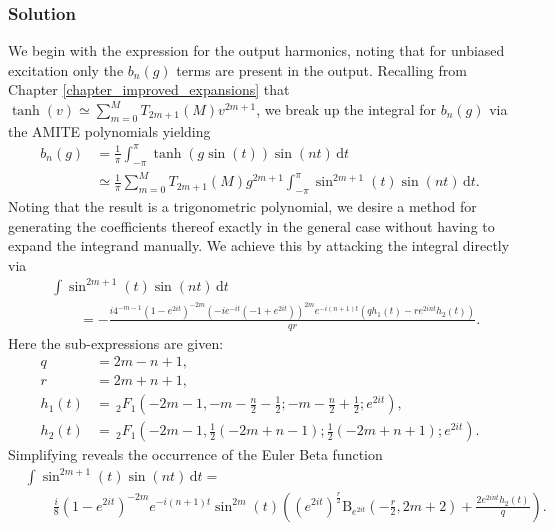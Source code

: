 \subsubsection{Solution}
We begin with the expression for the output harmonics, noting that for unbiased
excitation only the $b_n(g)$ terms are present in the output.
Recalling from Chapter \ref{chapter_improved_expansions} that
$\tanh(v) \simeq \sum_{m=0}^{M} T_{2m+1}(M) v^{2m+1}$,
we break up the integral for $b_n(g)$ via the AMITE polynomials yielding
\begin{align}
	b_n(g) &= \frac{1}{\pi}\int_{-\pi}^{\pi} \! \tanh(g \sin(t)) \sin(nt) \, \mathrm{d}t \\
	       &\simeq \frac{1}{\pi} \sum_{m=0}^{M} T_{2m+1}(M) g^{2m+1}
	                            \int_{-\pi}^{\pi} \sin^{2m+1}(t) \sin(nt) \, \mathrm{d}t.
	                            \label{eq_nl_gain_integral}
\end{align}
Noting that the result is a trigonometric polynomial, we desire a method
for generating the coefficients thereof exactly in the general case
without having to expand the integrand manually.  We achieve this by
attacking the integral directly via
\begin{align}
	&\int \sin^{2m+1}(t) \sin(nt) \, \mathrm{d}t \nonumber\\
	&\quad\quad= -\frac{i 4^{-m-1} \left(1-e^{2 i t}\right)^{-2 m} \left(-i e^{-i t}
		\left(-1+e^{2 i t}\right)\right)^{2 m} e^{-i (n+1) t}
		    \left(
                q h_1(t) - r e^{2 i n t} h_2(t)
            \right)}{q r}.
\end{align}
Here the sub-expressions are given:
\begin{align*}
	q &= 2 m-n+1, \\
	r &= 2 m+n+1, \\
	h_1(t) &= \, _2F_1\left(-2 m-1,-m-\frac{n}{2}-\frac{1}{2};-m-\frac{n}{2}+\frac{1}{2};e^{2 i t}\right), \\
	h_2(t) &= \, _2F_1\left(-2 m-1,\frac{1}{2} (-2 m+n-1);\frac{1}{2} (-2 m+n+1);e^{2 i t}\right).
\end{align*}
Simplifying reveals the occurrence of the Euler Beta function
\begin{align}
	&\int \sin^{2m+1}(t) \sin(nt) \, \mathrm{d}t = \nonumber\\
	&\quad\quad\frac{i}{8} \left(1-e^{2 i t}\right)^{-2 m}
	    e^{-i (n+1) t} \sin ^{2 m}(t)
	    \left(
	        \left(e^{2 i t}\right)^{\frac{r}{2}}
	            \mathrm{B}_{e^{2 i t}}\left(-\frac{r}{2},2 m+2\right)
	            +\frac{2 e^{2 i n t} h_2(t)}{q}\right).
\end{align}
